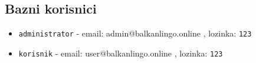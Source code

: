 		\subsection*{Bazni korisnici}
			\begin{itemize}
				\item \texttt{administrator} - email: admin@balkanlingo.online , lozinka: \texttt{123} 
				\item \texttt{korisnik} - email: user@balkanlingo.online , lozinka: \texttt{123}
			\end{itemize}
			
		\eject
